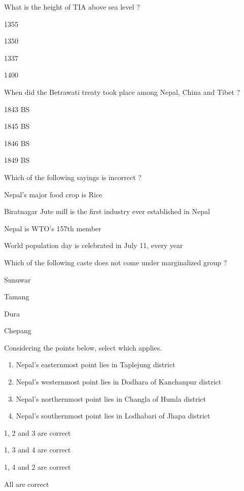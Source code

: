 \begin{questions}
\question What is the height of TIA above sea level ?
  \begin{items}
  \item 1355
  \item 1350
  \item* 1337
  \item 1400
  \end{items}

\question When did the Betrawati treaty took place among Nepal, China and Tibet ?
  \begin{items}
  \item 1843 BS
  \item 1845 BS
  \item 1846 BS
  \item* 1849 BS
  \end{items}

\question Which of the following sayings is incorrect ?
  \begin{items}
  \item Nepal's major food crop is Rice
  \item Biratnagar Jute mill is the first industry ever established in Nepal
  \item* Nepal is WTO's 157th member
  \item World population day is celebrated in July 11, every year
  \end{items}

\question Which of the following caste does not come under marginalized group ?
  \begin{items}
  \item Sunuwar
  \item Tamang
  \item Dura
  \item* Chepang
  \end{items}

\question Considering the points below, select which applies.
  \begin{enumerate}
  \item Nepal's easternmost point lies in Taplejung district
  \item Nepal's westernmost point lies in Dodhara of Kanchanpur district
  \item Nepal's northernmost point lies in Changla of Humla district
  \item Nepal's southernmost point lies in Lodhabari of Jhapa district
  \end{enumerate}

  \begin{items}
  \item 1, 2 and 3 are correct
  \item 1, 3 and 4 are correct
  \item 1, 4 and 2 are correct
  \item* All are correct
  \end{items}


\end{questions}
